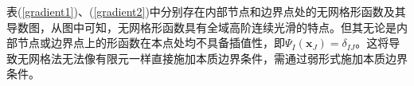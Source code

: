 表(\ref{gradient1})、(\ref{gradient2})中分别存在内部节点和边界点处的无网格形函数及其导数图，从图中可知，无网格形函数具有全域高阶连续光滑的特点。但其无论是内部节点或边界点上的形函数在本点处均不具备插值性，即$\Psi_I(\pmb{x}_J)=\delta_{IJ}$。这将导致无网格法无法像有限元一样直接施加本质边界条件，需通过弱形式施加本质边界条件。
